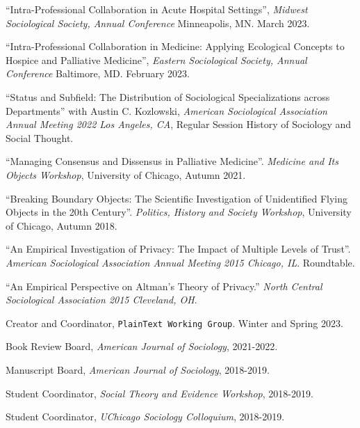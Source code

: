 \documentclass[11pt,article,oneside]{memoir}
\begin{document}
\ind ``Intra-Professional Collaboration in Acute Hospital Settings'', \emph{Midwest Sociological Society, Annual Conference} Minneapolis, MN. March 2023. \vspace{0.05in}

\ind ``Intra-Professional Collaboration in Medicine: Applying Ecological Concepts to Hospice and Palliative Medicine'', \emph{Eastern Sociological Society, Annual Conference} Baltimore, MD. February 2023. \vspace{0.05in} 

\ind ``Status and Subfield: The Distribution of Sociological Specializations across Departments'' with Austin C. Kozlowski, \emph{American Sociological Association Annual Meeting 2022 Los Angeles, CA}, Regular Session History of Sociology and Social Thought. \vspace{0.005in}

\ind ``Managing Consensus and Dissensus in Palliative Medicine''. \emph{Medicine and Its Objects Workshop}, University of Chicago, Autumn 2021. \vspace{0.05in}

\ind ``Breaking Boundary Objects: The Scientific Investigation of Unidentified Flying Objects in the 20th Century''. \emph{Politics, History and Society Workshop}, University of Chicago,  Autumn 2018. \vspace{0.05in}

\ind ``An Empirical Investigation of Privacy: The Impact of Multiple Levels of Trust''. \emph{American Sociological Association Annual Meeting 2015 Chicago, IL}. Roundtable. \vspace{0.05in}

\ind ``An Empirical Perspective on Altman's Theory of Privacy.'' \emph{North Central Sociological Association 2015 Cleveland, OH}.

\normalsize

\medskip
{}
\medskip

\ind  Creator and Coordinator, \texttt{PlainText Working Group}. Winter and Spring 2023.

\ind Book Review Board, \emph{American Journal of Sociology}, 2021-2022.

\ind Manuscript Board, \emph{American Journal of Sociology}, 2018-2019.

\ind Student Coordinator, \emph{Social Theory and Evidence Workshop}, 2018-2019.

\ind Student Coordinator, \emph{UChicago Sociology Colloquium}, 2018-2019.
\end{document}
